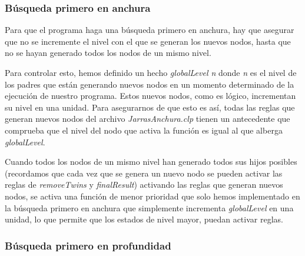 \documentclass[11pt,a4paper,final]{article}
\begin{document}
\subsubsection{Búsqueda primero en anchura} \label{anchura}
Para que el programa haga una búsqueda primero en anchura, hay que asegurar que no se incremente el nivel con el que se generan los nuevos nodos, hasta que no se hayan generado todos los nodos de un mismo nivel. 

Para controlar esto, hemos definido un hecho \emph{globalLevel n} donde \emph{n} es el nivel de los padres que están generando nuevos nodos en un momento determinado de la ejecución de nuestro programa. Estos nuevos nodos, como es lógico, incrementan su nivel en una unidad. Para asegurarnos de que esto es así, todas las reglas que generan nuevos nodos del archivo \emph{JarrasAnchura.clp} tienen un antecedente que comprueba que el nivel del nodo que activa la función es igual al que alberga \emph{globalLevel}.

Cuando todos los nodos de un mismo nivel han generado todos sus hijos posibles (recordamos que cada vez que se genera un nuevo nodo se pueden activar las reglas de \emph{removeTwins} y \emph{finalResult}) activando las reglas que generan nuevos nodos, se activa una función de menor prioridad que solo hemos implementado en la búsqueda primero en anchura que simplemente incrementa \emph{globalLevel} en una unidad, lo que permite que los estados de nivel mayor, puedan activar reglas.

\subsubsection{Búsqueda primero en profundidad} \label{profundidad} 
\end{document}
